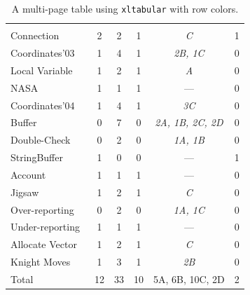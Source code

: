\bgroup
{}
\begin{xltabular}{\textwidth}{Xccccc}
  \caption{A multi-page table using \texttt{xltabular} with row colors.}
  \label{tab:hla:results}\\
                   &   
                                          &   
                                                  &    
                                                          &             
                                                                                  &  \\
Connection~\cite{Beckman08}       & 2     & 2     & 1     & \emph{C}              & 1 \\
Coordinates'03~\cite{Artho03}     & 1     & 4     & 1     & \emph{2B, 1C}         & 0 \\
Local Variable~\cite{Artho03}     & 1     & 2     & 1     & \emph{A}              & 0 \\
NASA~\cite{Artho03}               & 1     & 1     & 1     & ---                   & 0 \\
Coordinates'04~\cite{Artho04}     & 1     & 4     & 1     & \emph{3C}             & 0 \\
Buffer~\cite{Artho04}             & 0     & 7     & 0     & \emph{2A, 1B, 2C, 2D} & 0 \\
Double-Check~\cite{Artho04}       & 0     & 2     & 0     & \emph{1A, 1B}         & 0 \\
StringBuffer~\cite{Flanagan04}    & 1     & 0     & 0     & ---                   & 1 \\
Account~\cite{Praun03}            & 1     & 1     & 1     & ---                   & 0 \\
Jigsaw~\cite{Praun03}             & 1     & 2     & 1     & \emph{C}              & 0 \\
Over-reporting~\cite{Praun03}     & 0     & 2     & 0     & \emph{1A, 1C}         & 0 \\
Under-reporting~\cite{Praun03}    & 1     & 1     & 1     & ---                   & 0 \\
Allocate Vector~\cite{IBM-Rep}    & 1     & 2     & 1     & \emph{C}              & 0 \\
Knight Moves~\cite{Beckman08}     & 1     & 3     & 1     & \emph{2B}             & 0 \\
Total                            & 12      & 33        & 10        & 5A, 6B, 10C, 2D       & 2 \\
\end{xltabular}
\egroup


